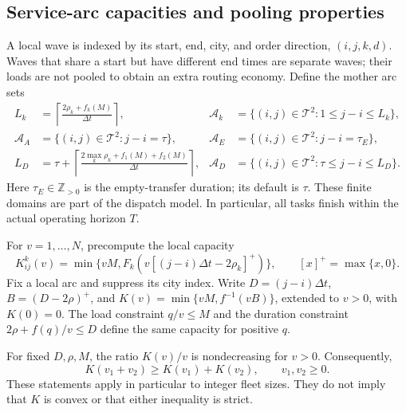 \subsection{Service-arc capacities and pooling properties}
\label{subsec:capacity-analysis}

A local wave is indexed by its start, end, city, and order direction,
$(i,j,k,d)$. Waves that share a start but have different end times are
separate waves; their loads are not pooled to obtain an extra routing
economy. Define the mother arc sets
\begin{align}
 L_k&=\left\lceil\frac{2\rho_k+f_k(M)}{\Delta t}\right\rceil,
 &\mathcal A_k&=\{(i,j)\in\mathcal T^2:1\leq j-i\leq L_k\},
 \label{mod:local-arcs}\\
 \mathcal A_A&=\{(i,j)\in\mathcal T^2:j-i=\tau\},
 &\mathcal A_E&=\{(i,j)\in\mathcal T^2:j-i=\tau_E\},
 \label{mod:movement-arcs}\\
 L_D&=\tau+\left\lceil
 \frac{2\max_k\rho_k+f_1(M)+f_2(M)}{\Delta t}\right\rceil,
 &\mathcal A_D&=\{(i,j)\in\mathcal T^2:\tau\leq j-i\leq L_D\}.
 \label{mod:direct-arcs}
\end{align}
Here $\tau_E\in\mathbb Z_{>0}$ is the empty-transfer duration; its default
is $\tau$. These finite domains are part of the dispatch model. In
particular, all tasks finish within the actual operating horizon $T$.

For $v=1,\ldots,N$, precompute the local capacity
\begin{equation}
 K^k_{ij}(v)=\min\{vM,F_k(v[(j-i)\Delta t-2\rho_k]^+)\},
 \qquad [x]^+=\max\{x,0\}.
 \label{mod:local-capacity}
\end{equation}
Fix a local arc and suppress its city index. Write $D=(j-i)\Delta t$,
$B=(D-2\rho)^+$, and $K(v)=\min\{vM,f^{-1}(vB)\}$, extended to
$v>0$, with $K(0)=0$. The load constraint $q/v\le M$ and the duration
constraint $2\rho+f(q)/v\le D$ define the same capacity for positive $q$.

\begin{proposition}
\label{prop:analysis-capacity}
For fixed $D,\rho,M$, the ratio $K(v)/v$ is nondecreasing for $v>0$.
Consequently,
\begin{equation}
 K(v_1+v_2)\ge K(v_1)+K(v_2),\qquad v_1,v_2\ge0.
 \label{eq:analysis-superadditive}
\end{equation}
These statements apply in particular to integer fleet sizes. They do not
imply that $K$ is convex or that either inequality is strict.
\end{proposition}

